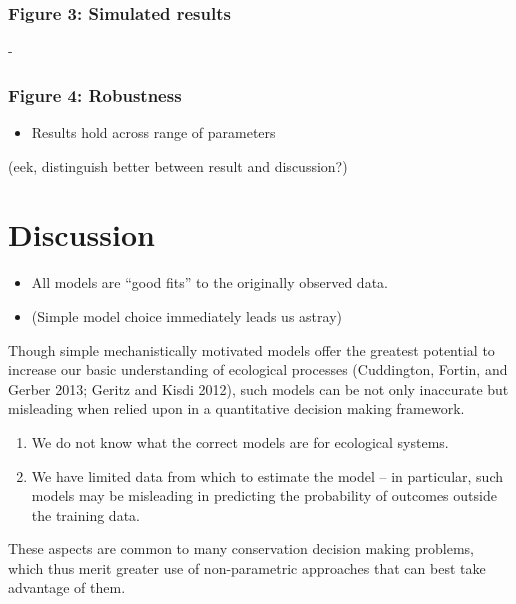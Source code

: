 \documentclass[author-year, review]{elsarticle} %
\begin{document}
\subsubsection{Figure 3: Simulated
results}\label{figure-3-simulated-results}

-

\subsubsection{Figure 4: Robustness}\label{figure-4-robustness}

\begin{itemize}
\itemsep1pt\parskip0pt
\item
  Results hold across range of parameters
\end{itemize}

(eek, distinguish better between result and discussion?)

\section{Discussion}\label{discussion}

\begin{itemize}
\item
  All models are ``good fits'' to the originally observed data.
\item
  (Simple model choice immediately leads us astray)
\end{itemize}

Though simple mechanistically motivated models offer the greatest
potential to increase our basic understanding of ecological processes
(Cuddington, Fortin, and Gerber 2013; Geritz and Kisdi 2012), such
models can be not only inaccurate but misleading when relied upon in a
quantitative decision making framework.

\begin{enumerate}
\def\labelenumi{\arabic{enumi}.}
\itemsep1pt\parskip0pt
\item
  We do not know what the correct models are for ecological systems.
\item
  We have limited data from which to estimate the model -- in
  particular, such models may be misleading in predicting the
  probability of outcomes outside the training data.
\end{enumerate}

These aspects are common to many conservation decision making problems,
which thus merit greater use of non-parametric approaches that can best
take advantage of them.
\end{document}
